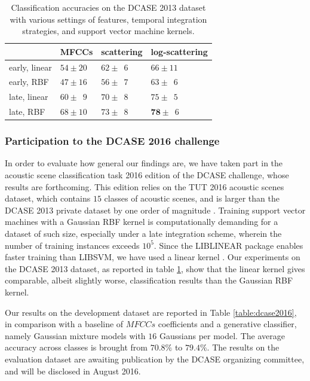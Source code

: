 \documentclass[journal]{IEEEtran}
\begin{document}
\begin{table}
\begin{center}
\begin{tabular}{llll}
             & MFCCs         & scattering & log-scattering  \\
             \hline
early, linear  & $54\pm20$   & $62\pm\phantom{0}6$  & $66\pm11$     \\
early, RBF     & $47\pm16$  & $56\pm\phantom{0}7$  & $63\pm\phantom{0}6$   \\
late, linear  & $60\pm\phantom{0}9$ & $70\pm\phantom{0}8$  & $75\pm\phantom{0}5$   \\
late, RBF     & $68\pm10$ & $73\pm\phantom{0}8$  & $\mathbf{78}\pm\phantom{0}6$   \\
\end{tabular}
\caption{Classification accuracies on the DCASE 2013 dataset with various settings of features, temporal integration strategies, and support vector machine kernels.}
\end{center}
\label{table:dcase2013}
\end{table}

\subsubsection*{Participation to the DCASE 2016 challenge}
In order to evaluate how general our findings are, we have taken part in the acoustic scene classification task 2016 edition of the DCASE challenge, whose results are forthcoming.
This edition relies on the TUT 2016 acoustic scenes dataset, which contains $15$ classes of acoustic scenes, and is larger than the DCASE 2013 private dataset by one order of magnitude \cite{Mesaros2016_EUSIPCO}.
Training support vector machines with a Gaussian RBF kernel is computationally demanding for a dataset of such size, especially under a late integration scheme, wherein the number of training instances exceeds $10^5$.
Since the LIBLINEAR package enables faster training than LIBSVM, we have used a linear kernel \cite{Hsu2003}.
Our experiments on the DCASE 2013 dataset, as reported in table \ref{table:dcase2013}, show that the linear kernel gives comparable, albeit slightly worse, classification results than the Gaussian RBF kernel.

Our results on the development dataset are reported in Table \ref{table:dcase2016}, in comparison with a baseline of $MFCCs$ coefficients and a generative classifier, namely Gaussian mixture models with $16$ Gaussians per model.
The average accuracy across classes is brought from $70.8\%$ to $79.4\%$.
The results on the evaluation dataset are awaiting publication by the DCASE organizing committee, and will be disclosed in August 2016.
\end{document}
